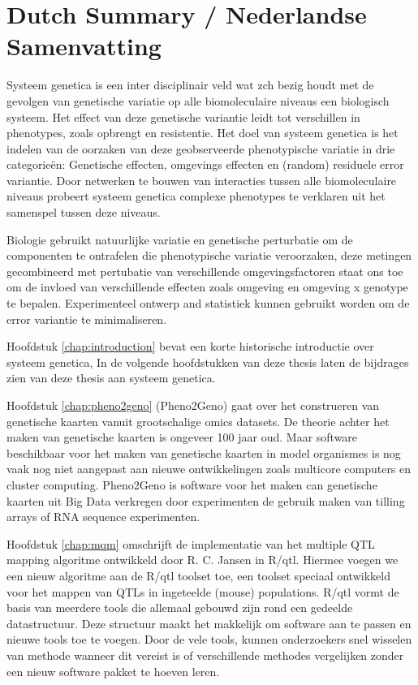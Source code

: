 \section{Dutch Summary / Nederlandse Samenvatting}
Systeem genetica is een inter disciplinair veld wat zch bezig houdt met de gevolgen van 
genetische variatie op alle biomoleculaire niveaus een biologisch systeem. Het effect van 
deze genetische variantie leidt tot verschillen in phenotypes, zoals opbrengt en resistentie. 
Het doel van systeem genetica is het indelen van de oorzaken van deze geobserveerde 
phenotypische variatie in drie categorie\"en: Genetische effecten, omgevings effecten en 
(random) residuele error variantie. Door netwerken te bouwen van interacties tussen 
alle biomoleculaire niveaus probeert systeem genetica complexe phenotypes te verklaren uit 
het samenspel tussen deze niveaus.

Biologie gebruikt natuurlijke variatie en genetische perturbatie om de componenten te ontrafelen
die phenotypische variatie veroorzaken, deze metingen gecombineerd met pertubatie van verschillende 
omgevingsfactoren staat ons toe om de invloed van verschillende effecten zoals omgeving en 
omgeving x genotype te bepalen. Experimenteel ontwerp and statistiek kunnen gebruikt worden om 
de error variantie te minimaliseren.

Hoofdstuk \ref{chap:introduction} bevat een korte historische introductie over systeem genetica, 
In de volgende hoofdstukken van deze thesis laten de bijdrages zien van deze thesis aan systeem genetica.

Hoofdstuk \ref{chap:pheno2geno} (Pheno2Geno) gaat over het construeren van genetische kaarten vanuit grootschalige 
omics datasets. De theorie achter het maken van genetische kaarten is ongeveer 100 jaar oud. Maar 
software beschikbaar voor het maken van genetische kaarten in model organismes is nog 
vaak nog niet aangepast aan nieuwe ontwikkelingen zoals multicore computers en cluster computing. 
Pheno2Geno is software voor het maken can genetische kaarten uit Big Data verkregen door 
experimenten de gebruik maken van tilling arrays of RNA sequence experimenten.

Hoofdstuk \ref{chap:mqm} omschrijft de implementatie van het multiple QTL mapping algoritme ontwikkeld door 
R. C. Jansen in R/qtl. Hiermee voegen we een nieuw algoritme aan de R/qtl toolset toe, een 
toolset speciaal ontwikkeld voor het mappen van QTLs in ingeteelde (mouse) populations. R/qtl 
vormt de basis van meerdere tools die allemaal gebouwd zijn rond een gedeelde datastructuur. 
Deze structuur maakt het makkelijk om software aan te passen en nieuwe tools toe te voegen.
Door de vele tools, kunnen onderzoekers snel wisselen van methode wanneer dit vereist is of 
verschillende methodes vergelijken zonder een nieuw software pakket te hoeven leren.

